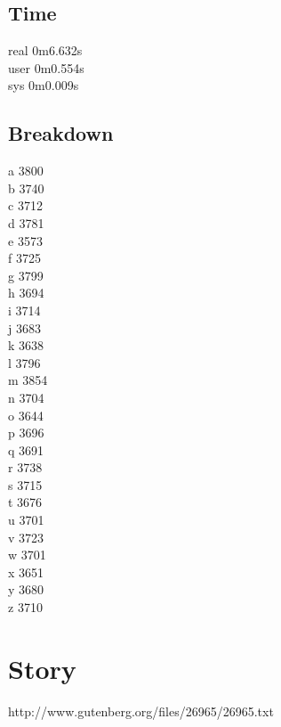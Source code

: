 \documentclass[twocolumn]{article}
\begin{document}
\subsection*{Time} %
\label{ssub:time}
real    0m6.632s\\
user    0m0.554s\\
sys     0m0.009s\\

\subsection*{Breakdown} %
\label{ssub:breakdown}
a 3800\\
b 3740\\
c 3712\\
d 3781\\
e 3573\\
f 3725\\
g 3799\\
h 3694\\
i 3714\\
j 3683\\
k 3638\\
l 3796\\
m 3854\\
n 3704\\
o 3644\\
p 3696\\
q 3691\\
r 3738\\
s 3715\\
t 3676\\
u 3701\\
v 3723\\
w 3701\\
x 3651\\
y 3680\\
z 3710




\section*{Story} %
\label{sec:story}
http://www.gutenberg.org/files/26965/26965.txt
\end{document}
